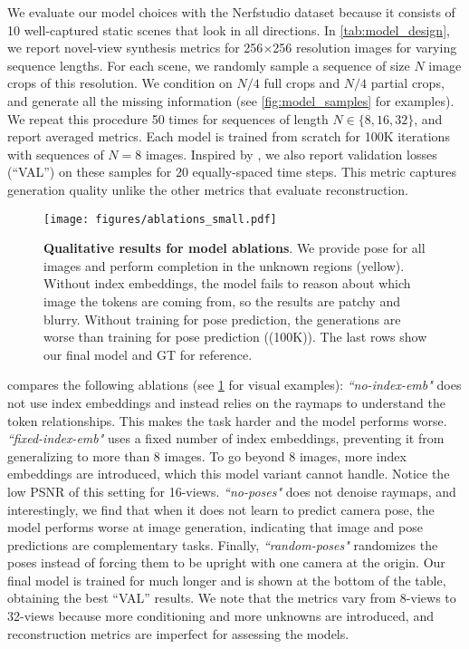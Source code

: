We evaluate our model choices with the Nerfstudio dataset \cite{tancik2023nerfstudio} because it consists of 10 well-captured static scenes that look in all directions.
In \cref{tab:model_design}, we report novel-view synthesis metrics for 256$\times$256 resolution images for varying sequence lengths.
For each scene, we randomly sample a sequence of size $N$ image crops of this resolution.
We condition on $N/4$ full crops and $N/4$ partial crops, and generate all the missing information (see \cref{fig:model_samples} for examples).
We repeat this procedure 50 times for sequences of length $N \!\in\! \{8,16,32\}$, and report averaged metrics.
Each model is trained from scratch for 100K iterations with sequences of $N \!=\! 8$ images.
Inspired by \citet{esser2024scaling}, we also report validation losses (``VAL'') on these samples for 20 equally-spaced time steps.
This metric captures generation quality unlike the other metrics that evaluate reconstruction.

\begin{figure}%
\centering
\texttt{[image: figures/ablations\_small.pdf]}
\caption{\label{fig:qualitative_model_ablations}%
    \textbf{Qualitative results for model ablations}.
    We provide pose for all images and perform completion in the unknown regions (yellow).
    Without index embeddings, the model fails to reason about which image the tokens are coming from, so the results are patchy and blurry.
    Without training for pose prediction, the generations are worse than training for pose prediction (\method (100K)).
    The last rows show our final model and GT for reference.
}
\vspace{-10px}
\end{figure}

 compares the following ablations (see \cref{fig:qualitative_model_ablations} for visual examples):
\textit{``no-index-emb"} does not use index embeddings and instead relies on the raymaps to understand the token relationships.
This makes the task harder and the model performs worse.
\textit{``fixed-index-emb"} uses a fixed number of index embeddings, preventing it from generalizing to more than 8 images.
To go beyond 8 images, more index embeddings are introduced, which this model variant cannot handle.
Notice the low PSNR of this setting for 16-views.
\textit{``no-poses"} does not denoise raymaps, and interestingly, we find that when it does not learn to predict camera pose, the model performs worse at image generation, indicating that image and pose predictions are complementary tasks.
Finally, \textit{``random-poses"} randomizes the poses instead of forcing them to be upright with one camera at the origin.
Our final model is trained for much longer and is shown at the bottom of the table, obtaining the best ``VAL'' results.
We note that the metrics vary from 8-views to 32-views because more conditioning and more unknowns are introduced, and reconstruction metrics are imperfect for assessing the models.

